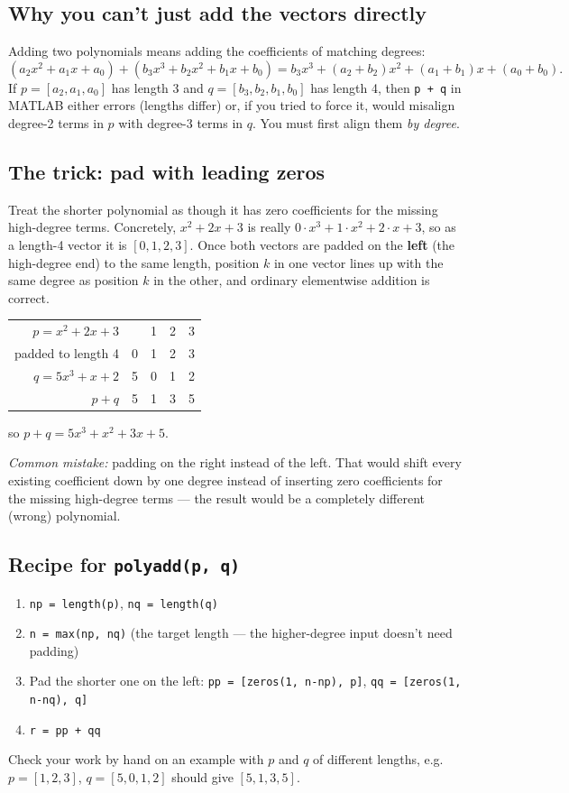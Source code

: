 \documentclass[11pt]{article}
\begin{document}
\subsection*{Why you can't just add the vectors directly}
Adding two polynomials means adding the coefficients of matching
degrees:
\[
  (a_2x^2+a_1x+a_0) + (b_3x^3+b_2x^2+b_1x+b_0)
  = b_3x^3 + (a_2+b_2)x^2 + (a_1+b_1)x + (a_0+b_0).
\]
If $p=[a_2,a_1,a_0]$ has length 3 and $q=[b_3,b_2,b_1,b_0]$ has length 4,
then \texttt{p + q} in MATLAB either errors (lengths differ) or, if you
tried to force it, would misalign degree-2 terms in $p$ with degree-3
terms in $q$. You must first align them \emph{by degree}.

\subsection*{The trick: pad with leading zeros}
Treat the shorter polynomial as though it has zero coefficients for the
missing high-degree terms. Concretely, $x^2+2x+3$ is really
$0\cdot x^3 + 1\cdot x^2 + 2\cdot x + 3$, so as a length-4 vector it is
$[0,1,2,3]$. Once both vectors are padded on the \textbf{left} (the
high-degree end) to the same length, position $k$ in one vector lines
up with the same degree as position $k$ in the other, and ordinary
elementwise addition is correct.

\begin{center}
\begin{tabular}{r c c c c}
  $p = x^2+2x+3$      &   & 1 & 2 & 3 \\
  padded to length 4  & 0 & 1 & 2 & 3 \\
  $q = 5x^3+x+2$       & 5 & 0 & 1 & 2 \\
  \hline
  $p+q$               & 5 & 1 & 3 & 5 \\
\end{tabular}
\end{center}
so $p+q = 5x^3+x^2+3x+5$.

\emph{Common mistake:} padding on the right instead of the left. That
would shift every existing coefficient down by one degree instead of
inserting zero coefficients for the missing high-degree terms --- the
result would be a completely different (wrong) polynomial.

\subsection*{Recipe for \texttt{polyadd(p, q)}}
\begin{enumerate}
  \item \texttt{np = length(p)}, \texttt{nq = length(q)}
  \item \texttt{n = max(np, nq)} \quad (the target length --- the
        higher-degree input doesn't need padding)
  \item Pad the shorter one on the left:
        \texttt{pp = [zeros(1, n-np), p]},
        \texttt{qq = [zeros(1, n-nq), q]}
  \item \texttt{r = pp + qq}
\end{enumerate}
Check your work by hand on an example with $p$ and $q$ of different
lengths, e.g.\ $p=[1,2,3]$, $q=[5,0,1,2]$ should give $[5,1,3,5]$.
\end{document}
